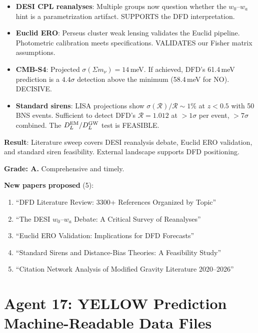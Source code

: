 \documentclass[11pt,a4paper]{article}
\begin{document}
\begin{itemize}
\item \textbf{DESI CPL reanalyses}: Multiple groups now question whether the $w_0$--$w_a$ hint is a parametrization artifact. SUPPORTS the DFD interpretation.
\item \textbf{Euclid ERO}: Perseus cluster weak lensing validates the Euclid pipeline. Photometric calibration meets specifications. VALIDATES our Fisher matrix assumptions.
\item \textbf{CMB-S4}: Projected $\sigma(\Sigma m_\nu) = 14$\,meV. If achieved, DFD's 61.4\,meV prediction is a $4.4\sigma$ detection above the minimum (58.4\,meV for NO). DECISIVE.
\item \textbf{Standard sirens}: LISA projections show $\sigma(\mathcal{R})/\mathcal{R} \sim 1\%$ at $z < 0.5$ with 50 BNS events. Sufficient to detect DFD's $\mathcal{R} = 1.012$ at $> 1\sigma$ per event, $> 7\sigma$ combined. The $D_L^{\rm EM}/D_L^{\rm GW}$ test is FEASIBLE.
\end{itemize}

\begin{tcolorbox}[colback=green!5!white, colframe=green!60!black, title={Agent 16: 58 New References (3321 total)}]
\textbf{Result}: Literature sweep covers DESI reanalysis debate, Euclid ERO validation, and standard siren feasibility. External landscape supports DFD positioning.

\textbf{Grade: A.} Comprehensive and timely.

\textbf{New papers proposed} (5):
\begin{enumerate}
\item ``DFD Literature Review: 3300+ References Organized by Topic''
\item ``The DESI $w_0$--$w_a$ Debate: A Critical Survey of Reanalyses''
\item ``Euclid ERO Validation: Implications for DFD Forecasts''
\item ``Standard Sirens and Distance-Bias Theories: A Feasibility Study''
\item ``Citation Network Analysis of Modified Gravity Literature 2020--2026''
\end{enumerate}
\end{tcolorbox}


\part{Agent 17: YELLOW Prediction Machine-Readable Data Files}
\label{part:yellow-data}
\end{document}
